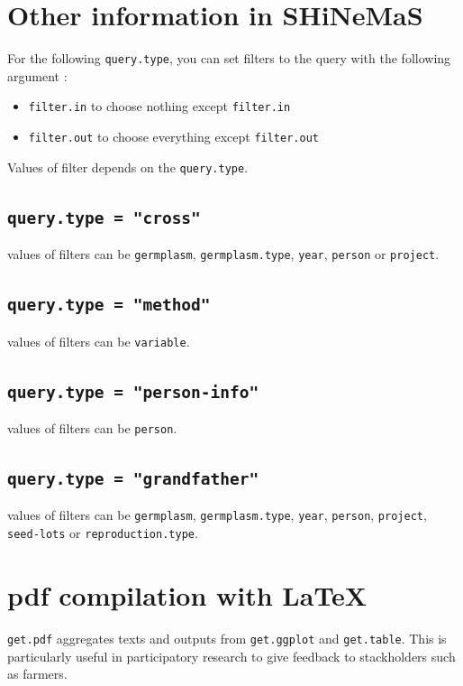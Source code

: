 \documentclass{article}\usepackage[]{graphicx}\usepackage[]{color}
\renewcommand{\sl}{seed-lots}
\newcommand{\BD}{SHiNeMaS}
\begin{document}
\newpage


\section{Other information in \BD}

For the following \texttt{query.type}, you can set filters to the query with the following argument :
\begin{itemize}
\item \texttt{filter.in} to choose nothing except \texttt{filter.in}
\item \texttt{filter.out} to choose everything except \texttt{filter.out}
\end{itemize}

Values of filter depends on the \texttt{query.type}.

\subsection{\texttt{query.type = "cross"}}
values of filters can be \texttt{germplasm}, \texttt{germplasm.type}, \texttt{year}, \texttt{person} or \texttt{project}.


\subsection{\texttt{query.type = "method"}}
values of filters can be \texttt{variable}.


\subsection{\texttt{query.type = "person-info"}}
values of filters can be \texttt{person}.


\subsection{\texttt{query.type = "grandfather"}}
values of filters can be \texttt{germplasm}, \texttt{germplasm.type}, \texttt{year}, \texttt{person}, \texttt{project}, \texttt{\sl} or \texttt{reproduction.type}.



\newpage


\section{pdf compilation with \LaTeX}
\label{pdf}

\texttt{get.pdf} aggregates texts and outputs from \texttt{get.ggplot} and \texttt{get.table}.
This is particularly useful in participatory research to give feedback to stackholders such as farmers.
\end{document}
